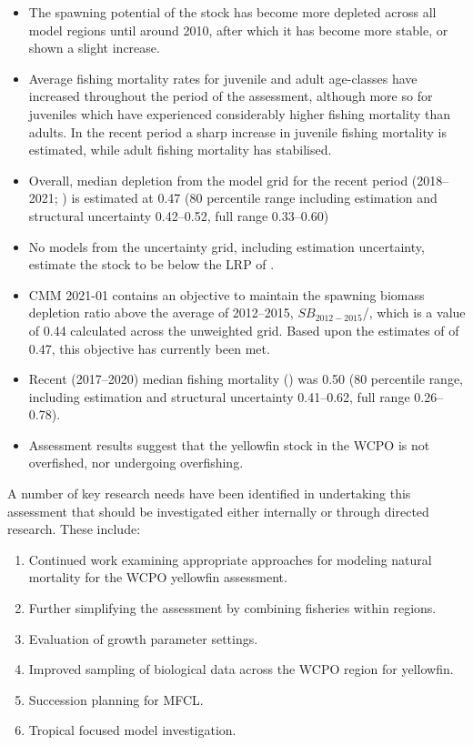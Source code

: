 \begin{itemize}
  \item The spawning potential of the stock has become more depleted across all model regions until around 2010, after which it has become more stable, or shown a slight increase.
  \item Average fishing mortality rates for juvenile and adult age-classes have increased throughout the period of the assessment, although more so for juveniles which have experienced considerably higher fishing mortality than adults. In the recent period a sharp increase in juvenile fishing mortality is estimated, while adult fishing mortality has stabilised.
  \item Overall, median depletion from the model grid for the recent period (2018--2021; \sbrsbfo) is estimated at 0.47 (80 percentile range including estimation and structural uncertainty 0.42--0.52, full range 0.33--0.60)
  \item No models from the uncertainty grid, including estimation uncertainty, estimate the stock to be below the LRP of \lrp.
  \item CMM 2021-01 contains an objective to maintain the spawning biomass depletion ratio above the average of 2012--2015, $\mathit{SB}_{2012-2015}$/\sbfo, which is a value of 0.44 calculated across the unweighted grid. Based upon the estimates of \sbrsbfo of 0.47, this objective has currently been met.
  \item Recent (2017--2020) median fishing mortality (\fref) was 0.50 (80 percentile range, including estimation and structural uncertainty 0.41--0.62, full range 0.26--0.78).
  \item Assessment results suggest that the yellowfin stock in the WCPO is not overfished, nor undergoing overfishing.
\end{itemize}

A number of key research needs have been identified in undertaking this assessment that should be investigated either internally or through directed research. These include:

\begin{enumerate}
  \item Continued work examining appropriate approaches for modeling natural mortality for the WCPO yellowfin assessment.
  \item Further simplifying the assessment by combining fisheries within regions.
  \item Evaluation of growth parameter settings.
  \item Improved sampling of biological data across the WCPO region for yellowfin.
  \item Succession planning for MFCL.
  \item Tropical focused model investigation.
\end{enumerate}
